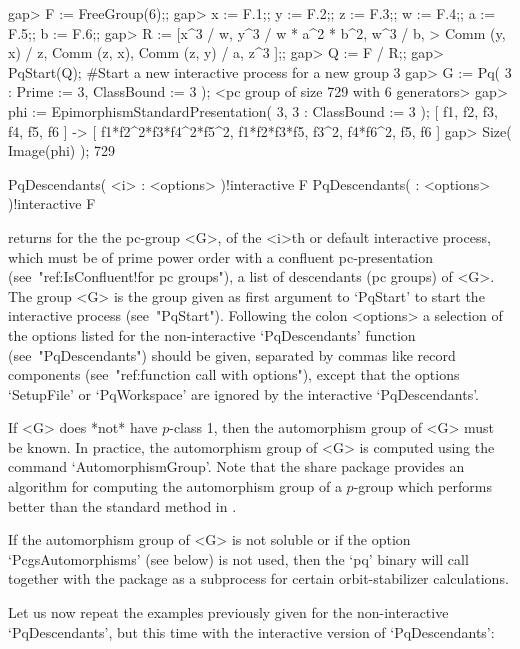 \beginexample
gap> F := FreeGroup(6);;
gap> x := F.1;; y := F.2;; z := F.3;; w := F.4;; a := F.5;; b := F.6;;
gap> R := [x^3 / w, y^3 / w * a^2 * b^2, w^3 / b,
>          Comm (y, x) / z, Comm (z, x), Comm (z, y) / a, z^3 ];;
gap> Q := F / R;;
gap> PqStart(Q); #Start a new interactive process for a new group       
3
gap> G := Pq( 3 : Prime := 3, ClassBound := 3 );
<pc group of size 729 with 6 generators>
gap> phi := EpimorphismStandardPresentation( 3, 3 : ClassBound := 3 );
[ f1, f2, f3, f4, f5, f6 ] -> [ f1*f2^2*f3*f4^2*f5^2, f1*f2*f3*f5, f3^2, 
  f4*f6^2, f5, f6 ]
gap> Size( Image(phi) );
729
\endexample

\>PqDescendants( <i> : <options> )!{interactive} F
\>PqDescendants( : <options> )!{interactive} F

returns for the the pc-group <G>, of the  <i>th  or  default  interactive
{\ANUPQ} process, which must be of prime power  order  with  a  confluent
pc-presentation  (see~"ref:IsConfluent!for  pc  groups"),   a   list   of
descendants (pc groups) of <G>. The group <G> is the group given as first
argument  to  `PqStart'  to  start  the  interactive   {\ANUPQ}   process
(see~"PqStart"). Following the colon <options> a selection of the options
listed    for    the     non-interactive     `PqDescendants'     function
(see~"PqDescendants") should be given, separated by  commas  like  record
components  (see~"ref:function  call  with  options"),  except  that  the
options `SetupFile' or  `PqWorkspace'  are  ignored  by  the  interactive
`PqDescendants'.

If <G> does *not* have $p$-class 1, then the automorphism  group  of  <G>
must be known. In practice, the automorphism group  of  <G>  is  computed
using the {\GAP} command `AutomorphismGroup'. Note that the {\GAP}  share
package {\AutPGrp} provides an algorithm for computing  the  automorphism
group of a $p$-group which performs better than the  standard  method  in
{\GAP}.

If the automorphism group  of  <G>  is  not  soluble  or  if  the  option
`PcgsAutomorphisms' (see below) is not used, then the  `pq'  binary  will
call {\GAP} together with the {\AutPGrp}  package  as  a  subprocess  for
certain orbit-stabilizer calculations.

Let us now repeat the examples previously given for  the  non-interactive
`PqDescendants',  but  this  time  with  the   interactive   version   of
`PqDescendants':

